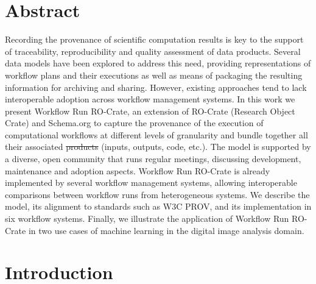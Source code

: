 \documentclass[10pt,letterpaper]{article}
\providecommand{\DIFaddtex}[1]{{\protect\color{blue}\uwave{#1}}} %
\providecommand{\DIFdeltex}[1]{{\protect\color{red}\sout{#1}}}                      %
\providecommand{\DIFaddbegin}{} %
\providecommand{\DIFaddend}{} %
\providecommand{\DIFdelbegin}{} %
\providecommand{\DIFdelend}{} %
\providecommand{\DIFadd}[1]{\texorpdfstring{\DIFaddtex{#1}}{#1}} %
\providecommand{\DIFdel}[1]{\texorpdfstring{\DIFdeltex{#1}}{}} %
\newcommand{\DIFscaledelfig}{0.5}
\newlength{\DIFdelgraphicswidth} %
\newlength{\DIFdelgraphicsheight} %
\newcommand{\DIFaddincludegraphics}[2][]{{\color{blue}\fbox{\DIFOincludegraphics[#1]{#2}}}} %
\newcommand{\DIFdelincludegraphics}[2][]{%
\sbox{\DIFdelgraphicsbox}{\DIFOincludegraphics[#1]{#2}}%
\settoboxwidth{\DIFdelgraphicswidth}{\DIFdelgraphicsbox} %
\settoboxtotalheight{\DIFdelgraphicsheight}{\DIFdelgraphicsbox} %
\scalebox{\DIFscaledelfig}{%
\parbox[b]{\DIFdelgraphicswidth}{\usebox{\DIFdelgraphicsbox}\\[-\baselineskip] \rule{\DIFdelgraphicswidth}{0em}}\llap{\resizebox{\DIFdelgraphicswidth}{\DIFdelgraphicsheight}{%
\setlength{\unitlength}{\DIFdelgraphicswidth}%
\begin{picture}(1,1)%
\thicklines\linethickness{2pt} %
{\color[rgb]{1,0,0}\put(0,0){\framebox(1,1){}}}%
{\color[rgb]{1,0,0}\put(0,0){\line( 1,1){1}}}%
{\color[rgb]{1,0,0}\put(0,1){\line(1,-1){1}}}%
\end{picture}%
}\hspace*{3pt}}} %
} %
\DeclareRobustCommand{\DIFaddbegin}{\DIFOaddbegin \let\includegraphics\DIFaddincludegraphics} %
\DeclareRobustCommand{\DIFaddend}{\DIFOaddend \let\includegraphics\DIFOincludegraphics} %
\DeclareRobustCommand{\DIFdelbegin}{\DIFOdelbegin \let\includegraphics\DIFdelincludegraphics} %
\DeclareRobustCommand{\DIFdelend}{\DIFOaddend \let\includegraphics\DIFOincludegraphics} %
\begin{document}
\section*{Abstract}
Recording the provenance of scientific computation results is key to the support of traceability, reproducibility and quality assessment of data products.
Several data models have been explored to address this need, providing representations of workflow plans and their executions as well as means of packaging the resulting information for archiving and sharing.
However, existing approaches tend to lack interoperable adoption across workflow management systems.
In this work we present Workflow Run RO-Crate, an extension of RO-Crate (Research Object Crate) and Schema.org to capture the provenance of the execution of computational workflows at different levels of granularity and bundle together all their associated \DIFdelbegin \DIFdel{products }\DIFdelend \DIFaddbegin \DIFadd{objects }\DIFaddend (inputs, outputs, code, etc.).
The model is supported by a diverse, open community that runs regular meetings, discussing development, maintenance and adoption aspects.
Workflow Run RO-Crate is already implemented by several workflow management systems, allowing interoperable comparisons between workflow runs from heterogeneous systems.
We describe the model, its alignment to standards such as W3C PROV, and its implementation in six workflow systems.
Finally, we illustrate the application of Workflow Run RO-Crate in two use cases of machine learning in the digital image analysis domain.


\linenumbers




\section{Introduction}\label{introduction}
\end{document}
